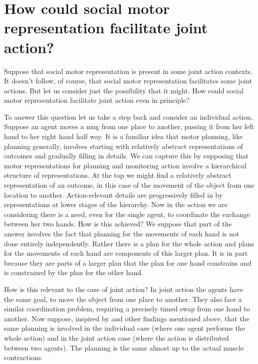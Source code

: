 \documentclass[12pt,\papersize]{extarticle}
\begin{document}
\section{How could social motor representation facilitate joint action?}
Suppose that social motor representation is present in some joint action contexts.
It doesn't follow, of course, that social motor representation facilitates some joint actions.
But let us consider just the possibility that it might.
How could social motor representation facilitate joint action even in principle?

To answer this question
let us take a step back and consider an individual action.
Suppose an agent moves a mug from one place to another, passing it from her left hand to her right hand half way.
It is a familiar idea that motor planning, like planning generally, involves starting with relatively abstract representations of outcomes and gradually filling in details.
We can capture this by supposing that 
motor representations for planning and monitoring action involve a hierarchical structure of representations.
At the top we might find a relatively abstract representation of an outcome, in this case of the movement of the object from one location to another.
Action-relevant details are progressively filled in by representations at lower stages of the hierarchy. 
Now in the action we are considering there is a need, even for the single agent, to coordinate the exchange between her two hands.
How is this achieved? 
We suppose that part of the answer involves the fact that planning for the movements of each hand is not done entirely independently.
Rather there is a plan for the whole action
and plans for the movements of each hand are components of this larger plan.
It is in part because they are parts of a larger plan that the plan for one hand constrains and is constrained by the plan for the other hand.


How is this relevant to the case of joint action?
In joint action the agents have the same goal, to move the object from one place to another.
They also face a similar coordination problem, requiring a precisely timed swap from one hand to another.
Now suppose, 
inspired by \citet{kourtis:2010_favoritism,kourtis:2012_predictive} and other findings mentioned above,
that the same planning is involved in the individual case (where one agent performs the whole action) and in the joint action case (where the action is distributed between two agents).
The planning is the same almost up to the actual muscle contractions.
\end{document}
